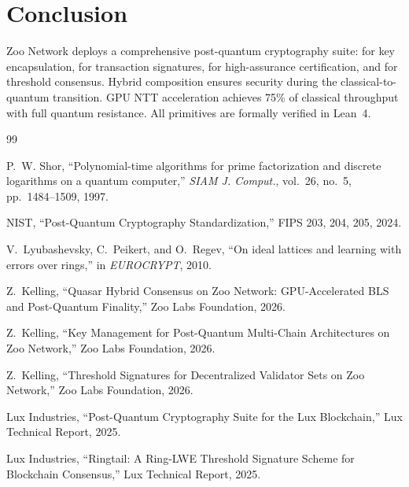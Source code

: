 \section{Conclusion}


Zoo Network deploys a comprehensive post-quantum cryptography suite: \MLKEM{} for key encapsulation, \MLDSA{} for transaction signatures, \SLHDSA{} for high-assurance certification, and \Ringtail{} for threshold consensus. Hybrid composition ensures security during the classical-to-quantum transition. GPU NTT acceleration achieves 75\% of classical throughput with full quantum resistance. All primitives are formally verified in Lean~4.

\begin{thebibliography}{99}

P.~W. Shor, ``Polynomial-time algorithms for prime factorization and discrete logarithms on a quantum computer,'' \textit{SIAM J. Comput.}, vol.~26, no.~5, pp.~1484--1509, 1997.

NIST, ``Post-Quantum Cryptography Standardization,'' FIPS 203, 204, 205, 2024.

V.~Lyubashevsky, C.~Peikert, and O.~Regev, ``On ideal lattices and learning with errors over rings,'' in \textit{EUROCRYPT}, 2010.

Z.~Kelling, ``Quasar Hybrid Consensus on Zoo Network: GPU-Accelerated BLS and Post-Quantum Finality,'' Zoo Labs Foundation, 2026.

Z.~Kelling, ``Key Management for Post-Quantum Multi-Chain Architectures on Zoo Network,'' Zoo Labs Foundation, 2026.

Z.~Kelling, ``Threshold Signatures for Decentralized Validator Sets on Zoo Network,'' Zoo Labs Foundation, 2026.

Lux Industries, ``Post-Quantum Cryptography Suite for the Lux Blockchain,'' Lux Technical Report, 2025.

Lux Industries, ``Ringtail: A Ring-LWE Threshold Signature Scheme for Blockchain Consensus,'' Lux Technical Report, 2025.

\end{thebibliography}

